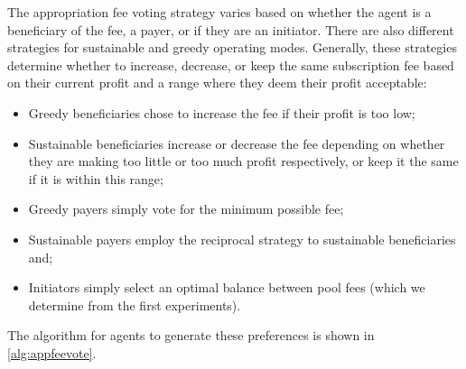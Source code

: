 The appropriation fee voting strategy varies based on whether the agent is a
beneficiary of the fee, a payer, or if they are an initiator. There are
also different strategies for sustainable and greedy operating modes.
Generally, these strategies determine whether to increase, decrease, or keep
the same subscription fee based on their current profit and a range where they
deem their profit acceptable:

\begin{itemize}
\item Greedy beneficiaries chose to increase the fee if their profit is too low;
\item Sustainable beneficiaries increase or decrease the fee depending on whether they are making too little or too much profit respectively, or keep it the same if it is within this range;
\item Greedy payers simply vote for the minimum possible fee;
\item Sustainable payers employ the reciprocal strategy to sustainable beneficiaries and;
\item Initiators simply select an optimal balance between pool fees (which we determine from the first experiments).
\end{itemize}

The algorithm for agents to generate these preferences is shown in \autoref{alg:appfeevote}.


				
